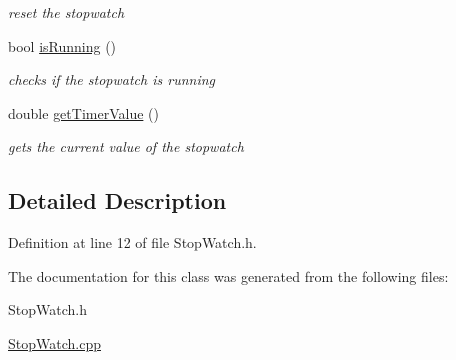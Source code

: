 \begin{DoxyCompactItemize}
\begin{DoxyCompactList}\small\item\em reset the stopwatch \end{DoxyCompactList}\item 
\hypertarget{class_stop_watch_a4358045d32002cb83ec62d1ebb9fb5ca}{bool \hyperlink{class_stop_watch_a4358045d32002cb83ec62d1ebb9fb5ca}{is\+Running} ()}\label{class_stop_watch_a4358045d32002cb83ec62d1ebb9fb5ca}

\begin{DoxyCompactList}\small\item\em checks if the stopwatch is running \end{DoxyCompactList}\item 
\hypertarget{class_stop_watch_a29945e425c084bb7df859c4c10cbd9fe}{double \hyperlink{class_stop_watch_a29945e425c084bb7df859c4c10cbd9fe}{get\+Timer\+Value} ()}\label{class_stop_watch_a29945e425c084bb7df859c4c10cbd9fe}

\begin{DoxyCompactList}\small\item\em gets the current value of the stopwatch \end{DoxyCompactList}\end{DoxyCompactItemize}


\subsection{Detailed Description}


Definition at line 12 of file Stop\+Watch.\+h.



The documentation for this class was generated from the following files\+:\begin{DoxyCompactItemize}
\item 
Stop\+Watch.\+h\item 
\hyperlink{_stop_watch_8cpp}{Stop\+Watch.\+cpp}\end{DoxyCompactItemize}
